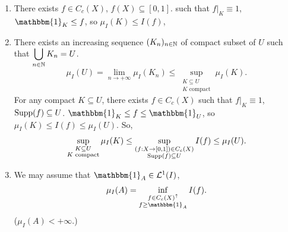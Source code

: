\begin{proofenv}
    \quad 
    \begin{enumerate}[label=(\arabic*)]
        \item There exists $f \in C_c (X)$, $f(X) \subseteq [0,1]$.
            such that $f|_K \equiv 1$, $\mathbbm{1}_{K} \le f$, so $\mu_{I} (K) \le I(f)$,
        \item There exists an increasing sequence $(K_n)_{n \in \mathbb{N}}$ of compact subset of $U$ such that $\displaystyle \bigcup_{n \in \mathbb{N}} K_{n} = U$.
            $$\mu_{I} (U) = \lim_{n \rightarrow +\infty} \mu_{I} (K_{n}) \le \sup_{\substack{K \subseteq U\\ K \text{ compact}}} \mu_{I} (K).$$
            For any compact $K \subseteq U$, there exists $f \in C_c(X)$ such that $f|_K \equiv 1$, $\operatorname{\mathrm{Supp}}(f) \subseteq U$.
            $\mathbbm{1}_{K} \le f \le \mathbbm{1}_{U}$, so $\mu_{I} (K) \le I(f) \le \mu_{I}(U)$.
            So,
            $$\sup_{\substack{K \subseteq U\\ K \text{ compact}}} \mu_{I} (K) \le \sup_{\substack{(f : X \rightarrow [0,1]) \in C_c(X)\\ \operatorname{\mathrm{Supp}}(f) \subseteq U}} I(f) \le \mu_{I} (U).$$
        \item We may assume that $\mathbbm{1}_{A} \in \mathcal{L}^1(I)$,
            $$\mu_{I}(A) = \inf_{\substack{f \in C_{c}(X)^\uparrow\\ f \ge  \mathbbm{1}_{A}}} I(f).$$
            ($\mu_{I}(A) < +\infty$.)


\end{enumerate}
\end{proofenv}
